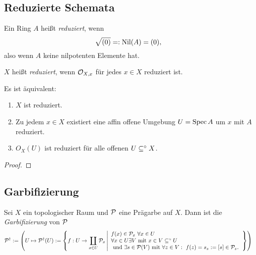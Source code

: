 \subsection{Reduzierte Schemata}

\begin{definition}
    Ein Ring $A$ heißt \emph{reduziert}, wenn
    \[ \sqrt{(0)} =: \operatorname{Nil}(A) = (0),\]
    also wenn $A$ keine nilpotenten Elemente hat.
\end{definition}

\begin{definition}
    $X$ heißt \emph{reduziert}, wenn $\mathcal{O}_{X,x}$ für jedes $x \in X$
    reduziert ist.
\end{definition}

\begin{satz}
    Es ist äquivalent:
    \begin{enumerate}
      \item $X$ ist reduziert.
      \item Zu jedem $x \in X$ existiert eine affin offene Umgebung 
        $U = \operatorname{Spec} A$ um $x$ mit $A$ reduziert.
      \item $O_X(U)$ ist reduziert für alle offenen $U\subseteq^\circ X$. 
    \end{enumerate}
\end{satz}
\begin{proof}
    \TODO
\end{proof}


\subsection{Garbifizierung}

\begin{definition}[Garbifizierung]
    \renewcommand{\P}{\cal P}
    Sei $X$ ein topologischer Raum und $\P$ eine Prägarbe auf $X$.
    Dann ist die \emph{Garbifizierung} von $\P$
    \[
        \P^\dagger := \left( U \mapsto \P^\dagger(U)
            := \left\{f : U \to \coprod_{x \in U} \P_x \left|
            \begin{array}{l} f(x) \in \P_x \ \forall x \in U \\
            \forall x \in U \exists V \text{ mit } x\in V\osubset U\\
            \text{ und }\exists s \in \P(V) \text{ mit }
            \forall z\in V:\ f(z) = s_z := [s] \in \P_z.
            \end{array}\right.\right\} \right)
    \]
\end{definition}

